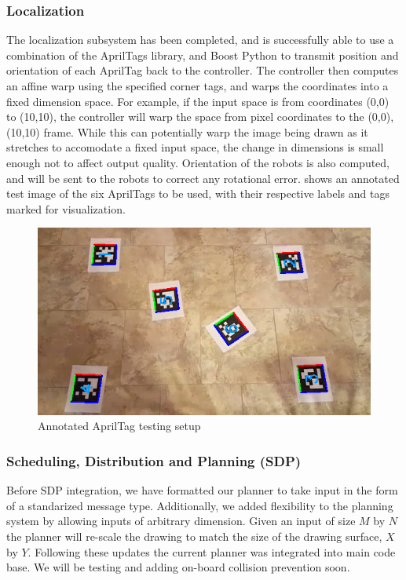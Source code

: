 \subsubsection{Localization}
The localization subsystem has been completed, and is successfully able to use a combination of the AprilTags library, and Boost Python to transmit position and orientation of each AprilTag back to the controller. The controller then computes an affine warp using the specified corner tags, and warps the coordinates into a fixed dimension space. For example, if the input space is from coordinates (0,0) to (10,10), the controller will warp the space from pixel coordinates to the (0,0), (10,10) frame. While this can potentially warp the image being drawn as it stretches to accomodate a fixed input space, the change in dimensions is small enough not to affect output quality. Orientation of the robots is also computed, and will be sent to the robots to correct any rotational error.  shows an annotated test image of the six AprilTags to be used, with their respective labels and tags marked for visualization.

\begin{figure}[h!]
\centering
\includegraphics[width=0.49\columnwidth]{figs/apriltag_test_annotated.png}
\caption{Annotated AprilTag testing setup}
\label{fig:localization_sample}
\end{figure}

\subsubsection{Scheduling, Distribution and Planning (SDP)}
Before SDP integration, we have formatted our planner to take input in the form of a standarized message type. Additionally, we added flexibility to the planning system by allowing inputs of arbitrary dimension. Given an input of size $M$ by $N$ the planner will re-scale the drawing to match the size of the drawing surface, $X$ by $Y$. Following these updates the current planner was integrated into main code base. We will be testing and adding on-board collision prevention soon.  

